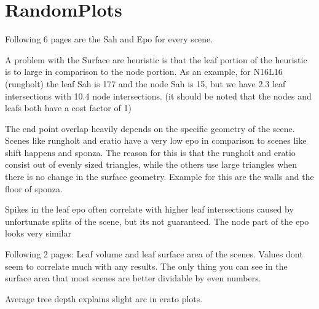 \section{RandomPlots}


\iftrue
Following 6 pages are the Sah and Epo for every scene.

A problem with the Surface are heuristic is that the leaf portion  of the heuristic is to large in comparison to the node portion. As an example, for N16L16 (rungholt) the leaf Sah is 177 and the node Sah is 15, but we have 2.3 leaf intersections with 10.4 node intersections. (it should be noted that the nodes and leafs both have a cost factor of 1)

The end point overlap heavily depends on the specific geometry of the scene. Scenes like rungholt and eratio have a very low epo in comparison to scenes like shift happens and sponza. The reason for this is that the rungholt and eratio consist out of evenly sized triangles, while the others use large triangles when there is no change in the surface geometry. Example for this are the walls and the floor of sponza.

Spikes in the leaf epo often correlate with higher leaf intersections caused by unfortunate splits of the scene, but its not guaranteed. The node part of the epo looks very similar

\newpage

\fi

\iftrue
Following 2 pages: Leaf volume and leaf surface area of the scenes. Values dont seem to correlate much with any results. The only thing you can see in the surface area that most scenes are better dividable by even numbers.
\newpage

\fi

\iftrue
{}
Average tree depth explains slight arc in erato plots.
\fi